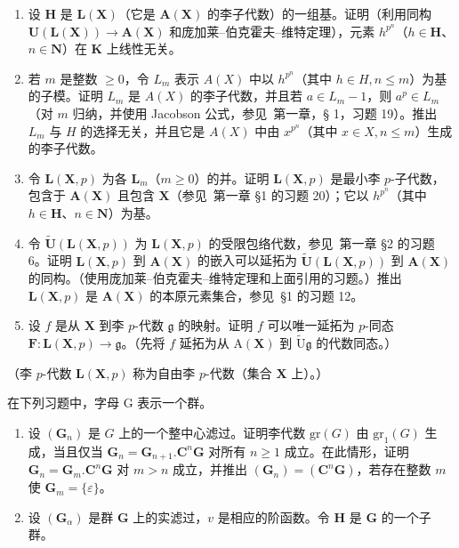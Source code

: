 \begin{enumerate}
\def\labelenumi{(\alph{enumi})}
\item
  设 \(\mathbf{H}\) 是 \(\mathbf{L}(\mathbf{X})\)（它是 \(\mathbf{A}(\mathbf{X})\) 的李子代数）的一组基。证明（利用同构 \(\mathbf{U}(\mathbf{L}(\mathbf{X})) \to \mathbf{A}(\mathbf{X})\) 和庞加莱–伯克霍夫–维特定理），元素 \(h^{p^n}\)（\(h \in \mathbf{H}\)、\(n \in \mathbf{N}\)）在 \(\mathbf{K}\) 上线性无关。
\item
  若 \(m\) 是整数 \(\geqslant 0\)，令 \(L_m\) 表示 \(A(X)\) 中以 \(h^{p^n}\)（其中 \(h \in H, n \leqslant m\)）为基的子模。证明 \(L_m\) 是 \(A(X)\) 的李子代数，并且若 \(a \in L_m - 1\)，则 \(a^p \in L_m\)（对 \(m\) 归纳，并使用 Jacobson 公式，参见~第一章，§ 1，习题 19）。推出 \(L_m\) 与 \(H\) 的选择无关，并且它是 \(A(X)\) 中由 \(x^{p^n}\)（其中 \(x \in X, n \leqslant m\)）生成的李子代数。
\item
  令 \(\mathbf{L}(\mathbf{X}, p)\) 为各 \(\mathbf{L}_m\)（\(m \geqslant 0\)）的并。证明 \(\mathbf{L}(\mathbf{X}, p)\) 是最小李 \(p\)-子代数，包含于 \(\mathbf{A}(\mathbf{X})\) 且包含 \(\mathbf{X}\)（参见~第一章 §1 的习题 20）；它以 \(h^{p^n}\)（其中 \(h \in \mathbf{H}\)、\(n \in \mathbf{N}\)）为基。
\item
  令 \(\tilde{\mathbf{U}}(\mathbf{L}(\mathbf{X},p))\) 为 \(\mathbf{L}(\mathbf{X},p)\) 的受限包络代数，参见~第一章 §2 的习题 6。证明 \(\mathbf{L}(\mathbf{X},p)\) 到 \(\mathbf{A}(\mathbf{X})\) 的嵌入可以延拓为 \(\tilde{\mathbf{U}}(\mathbf{L}(\mathbf{X},p))\) 到 \(\mathbf{A}(\mathbf{X})\) 的同构。（使用庞加莱–伯克霍夫–维特定理和上面引用的习题。）推出 \(\mathbf{L}(\mathbf{X},p)\) 是 \(\mathbf{A}(\mathbf{X})\) 的本原元素集合，参见~§1 的习题 12。
\item
  设 \(f\) 是从 \(\mathbf{X}\) 到李 \(p\)-代数 \(\mathfrak{g}\) 的映射。证明 \(f\) 可以唯一延拓为 \(p\)-同态 \(\mathbf{F} \colon \mathbf{L}(\mathbf{X}, p) \to \mathfrak{g}\)。（先将 \(f\) 延拓为从 \(\mathrm{A}(\mathbf{X})\) 到 \(\tilde{\mathrm{U}}\mathfrak{g}\) 的代数同态。）
\end{enumerate}

（李 \(p\)-代数 \(\mathbf{L}(\mathbf{X}, p)\) 称为自由李 \(p\)-代数（集合 \(\mathbf{X}\) 上）。）


在下列习题中，字母 G 表示一个群。

\begin{enumerate}
\def\labelenumi{\arabic{enumi}.}
\item
  设 \((\mathbf{G}_n)\) 是 \(G\) 上的一个整中心滤过。证明李代数 \(\mathrm{gr}(G)\) 由 \(\mathrm{gr}_1(G)\) 生成，当且仅当 \(\mathbf{G}_n = \mathbf{G}_{n+1}.\mathbf{C}^n\mathbf{G}\) 对所有 \(n \geqslant 1\) 成立。在此情形，证明 \(\mathbf{G}_n = \mathbf{G}_m.\mathbf{C}^n\mathbf{G}\) 对 \(m > n\) 成立，并推出 \((\mathbf{G}_n) = (\mathbf{C}^n\mathbf{G})\)，若存在整数 \(m\) 使 \(\mathbf{G}_m = \{\varepsilon\}\)。
\item
  设 \((\mathbf{G}_{\alpha})\) 是群 \(\mathbf{G}\) 上的实滤过，\(v\) 是相应的阶函数。令 \(\mathbf{H}\) 是 \(\mathbf{G}\) 的一个子群。
\end{enumerate}

